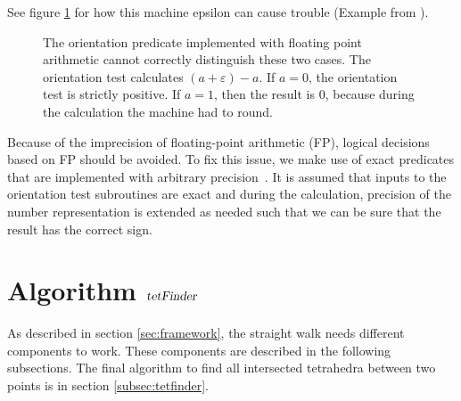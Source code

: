 \documentclass[../thesis.tex]{subfiles}
\begin{document}
See figure \ref{fig:floatingpoint} for how this machine epsilon can cause trouble (Example from \cite{Marek}).
\begin{figure}[htb]
  \centering
  \def\svgwidth{20em}
  
  \caption{The orientation predicate implemented with floating point arithmetic cannot correctly distinguish these two cases.
  The orientation test calculates $(a+\varepsilon)-a$. If $a=0$, the orientation test is strictly positive.
  If $a=1$, then the result is $0$, because during the calculation the machine had to round.
  }\label{fig:floatingpoint}
\end{figure}
Because of the imprecision of floating-point arithmetic (FP), logical decisions
based on FP should be avoided.
To fix this issue, we make use of exact predicates that are implemented with arbitrary precision~\cite{RichardShewchuk1997}.
It is assumed that inputs to the orientation test subroutines are exact and during the calculation,
precision of the number representation is extended as needed such that
we can be sure that the result has the correct sign.


\section{Algorithm $\textsl{tetFinder}$}
As described in section \ref{sec:framework}, the straight walk needs different
components to work. These components are described in the following subsections.
The final algorithm to find all intersected tetrahedra between two points is in section \ref{subsec:tetfinder}.
\end{document}
